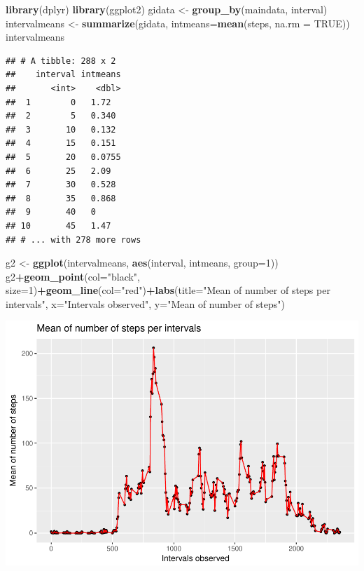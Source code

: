 \documentclass[]{article}
\newenvironment{Shaded}{\begin{snugshade}}{\end{snugshade}}
\newcommand{\KeywordTok}[1]{\textcolor[rgb]{0.13,0.29,0.53}{\textbf{#1}}}
\newcommand{\DataTypeTok}[1]{\textcolor[rgb]{0.13,0.29,0.53}{#1}}
\newcommand{\DecValTok}[1]{\textcolor[rgb]{0.00,0.00,0.81}{#1}}
\newcommand{\StringTok}[1]{\textcolor[rgb]{0.31,0.60,0.02}{#1}}
\newcommand{\OtherTok}[1]{\textcolor[rgb]{0.56,0.35,0.01}{#1}}
\newcommand{\OperatorTok}[1]{\textcolor[rgb]{0.81,0.36,0.00}{\textbf{#1}}}
\newcommand{\NormalTok}[1]{#1}
\begin{document}
\begin{Shaded}
\begin{Highlighting}[]
\KeywordTok{library}\NormalTok{(dplyr)}
\KeywordTok{library}\NormalTok{(ggplot2)}
\NormalTok{gidata <-}\StringTok{ }\KeywordTok{group_by}\NormalTok{(maindata, interval)}
\NormalTok{intervalmeans <-}\StringTok{ }\KeywordTok{summarize}\NormalTok{(gidata, }\DataTypeTok{intmeans=}\KeywordTok{mean}\NormalTok{(steps, }\DataTypeTok{na.rm =} \OtherTok{TRUE}\NormalTok{))}
\NormalTok{intervalmeans}
\end{Highlighting}
\end{Shaded}

\begin{verbatim}
## # A tibble: 288 x 2
##    interval intmeans
##       <int>    <dbl>
##  1        0   1.72  
##  2        5   0.340 
##  3       10   0.132 
##  4       15   0.151 
##  5       20   0.0755
##  6       25   2.09  
##  7       30   0.528 
##  8       35   0.868 
##  9       40   0     
## 10       45   1.47  
## # ... with 278 more rows
\end{verbatim}

\begin{Shaded}
\begin{Highlighting}[]
\NormalTok{g2 <-}\StringTok{ }\KeywordTok{ggplot}\NormalTok{(intervalmeans, }\KeywordTok{aes}\NormalTok{(interval, intmeans, }\DataTypeTok{group=}\DecValTok{1}\NormalTok{))}
\NormalTok{g2}\OperatorTok{+}\KeywordTok{geom_point}\NormalTok{(}\DataTypeTok{col=}\StringTok{"black"}\NormalTok{, }\DataTypeTok{size=}\DecValTok{1}\NormalTok{)}\OperatorTok{+}\KeywordTok{geom_line}\NormalTok{(}\DataTypeTok{col=}\StringTok{"red"}\NormalTok{)}\OperatorTok{+}\KeywordTok{labs}\NormalTok{(}\DataTypeTok{title=}\StringTok{"Mean of number of steps per intervals"}\NormalTok{, }\DataTypeTok{x=}\StringTok{"Intervals observed"}\NormalTok{, }\DataTypeTok{y=}\StringTok{"Mean of number of steps"}\NormalTok{)}
\end{Highlighting}
\end{Shaded}

\includegraphics{PA1_template_files/figure-latex/unnamed-chunk-7-1.pdf}
\end{document}

